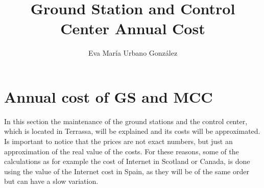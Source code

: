 \documentclass[12pt,a4paper]{report}
\author{Eva María Urbano González}
\title{Ground Station and Control Center Annual Cost}
\begin{document}
\maketitle
\listoffigures
\listoftables
\section{Annual cost of GS and MCC}
In this section the maintenance of the ground stations and the control center, which is located in Terrassa, will be explained and its costs will be approximated. Is important to notice that the prices are not exact numbers, but just an approximation of the real value of the costs. For these reasons, some of the calculations as for example the cost of Internet in Scotland or Canada, is done using the value of the Internet cost in Spain, as they will be of the same order but can have a slow variation.
\end{document}

